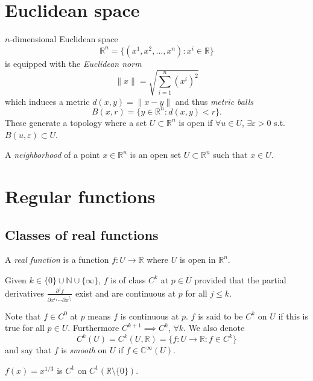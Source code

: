 \section{Euclidean space}

$n$-dimensional Euclidean space
$$
  \mathbb{R}^n
= \{ (x^1, x^2, \dots, x^n) : x^i \in \mathbb{R} \}
$$
is equipped with the \emph{Euclidean norm}
$$
\| x \| = \sqrt{ \sum_{i=1}^n (x^i)^2 }
$$
which induces a metric $d(x, y) = \| x - y \|$
and thus \emph{metric balls}
$$
  B(x, r)
= \{ y \in \mathbb{R}^n : d(x, y) < r \}.
$$
These generate a topology where a set $U \subset \mathbb{R}^n$ is open
if $\forall u \in U$, $\exists \varepsilon > 0$ s.t.
$B(u, \varepsilon) \subset U$.

\begin{defn}[Neighborhood]
A \emph{neighborhood} of a point $x \in \mathbb{R}^n$ is an open set
$U \subset \mathbb{R}^n$ such that $x \in U$.
\end{defn}


\section{Regular functions}

\subsection{Classes of real functions}

\begin{defn}
A \emph{real function} is a function $f : U \to \mathbb{R}$ where
$U$ is open in $\mathbb{R}^n$.

Given $k \in \{ 0 \} \cup \mathbb{N} \cup \{ \infty \}$, $f$ is of
class $C^k$ at $p \in U$ provided that the partial derivatives
$\frac{\partial^j f}{\partial x^{i_1} \cdots \partial x^{i_j}}$ exist
and are continuous at $p$ for all $j \leq k$.
\end{defn}

Note that $f \in C^0$ at $p$ means $f$ is continuous at $p$. $f$ is
said to be $C^k$ on $U$ if this is true for all $p \in U$. Furthermore
$C^{k+1} \implies C^k$, $\forall k$. We also  denote
$$
  C^k(U)
= C^k(U, \mathbb{R})
= \{ f: U \to \mathbb{R} : f \in C^k \}
$$
and say that $f$ is \emph{smooth} on $U$ if $f \in
\mathbb{C}^\infty(U)$.

\begin{xmpl}
$f(x) = x^{1 / 3}$ is $C^1$ on $C^1(\mathbb{R} \setminus \{ 0 \})$.
\end{xmpl}

